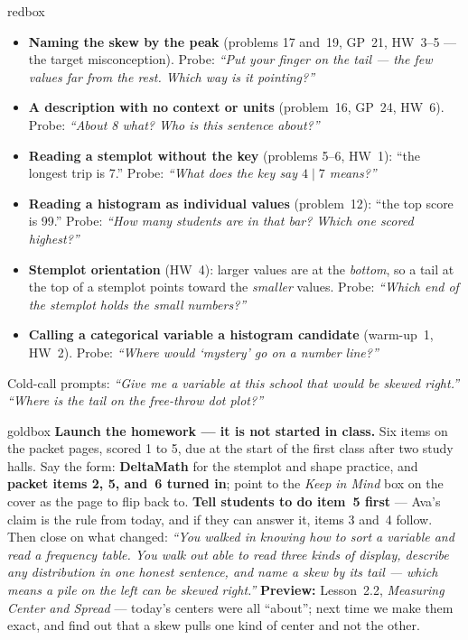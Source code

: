 \documentclass[10pt]{article}
\begin{document}
\boxguard
\begin{skillbox}{redbox}
\begin{itemize}[leftmargin=1.2em, nosep]
  \item \textbf{Naming the skew by the peak} (problems 17 and~19, GP~21, HW~3--5 --- the target
        misconception). Probe: \emph{``Put your finger on the tail --- the few values far from the
        rest. Which way is it pointing?''}
  \item \textbf{A description with no context or units} (problem~16, GP~24, HW~6). Probe:
        \emph{``About 8 \emph{what}? Who is this sentence about?''}
  \item \textbf{Reading a stemplot without the key} (problems 5--6, HW~1): ``the longest trip is
        7.'' Probe: \emph{``What does the key say $4\mid7$ means?''}
  \item \textbf{Reading a histogram as individual values} (problem~12): ``the top score is 99.''
        Probe: \emph{``How many students are in that bar? Which one scored highest?''}
  \item \textbf{Stemplot orientation} (HW~4): larger values are at the \emph{bottom}, so a tail
        at the top of a stemplot points toward the \emph{smaller} values. Probe: \emph{``Which end
        of the stemplot holds the small numbers?''}
  \item \textbf{Calling a categorical variable a histogram candidate} (warm-up~1, HW~2). Probe:
        \emph{``Where would `mystery' go on a number line?''}
\end{itemize}
Cold-call prompts: \emph{``Give me a variable at this school that would be skewed right.''}
\quad \emph{``Where is the tail on the free-throw dot plot?''}
\end{skillbox}

\boxguard
\begin{skillbox}{goldbox}
\textbf{Launch the homework --- it is not started in class.} Six items on the packet pages,
scored 1 to 5, due at the start of the first class after two study halls. Say the form:
\textbf{DeltaMath} for the stemplot and shape practice, and \textbf{packet items 2, 5, and~6
turned in}; point to the \emph{Keep in Mind} box on the cover as the
page to flip back to. \textbf{Tell students to do item~5 first} --- Ava's claim is the rule from
today, and if they can answer it, items 3 and~4 follow. Then close on what changed:
\emph{``You walked in knowing how to sort a variable and read a frequency table. You walk out
able to read three kinds of display, describe any distribution in one honest sentence, and name
a skew by its tail --- which means a pile on the left can be skewed right.''}
\textbf{Preview:} Lesson~2.2, \emph{Measuring Center and Spread} --- today's centers were all
``about''; next time we make them exact, and find out that a skew pulls one kind of center and
not the other.
\end{skillbox}
\end{document}
